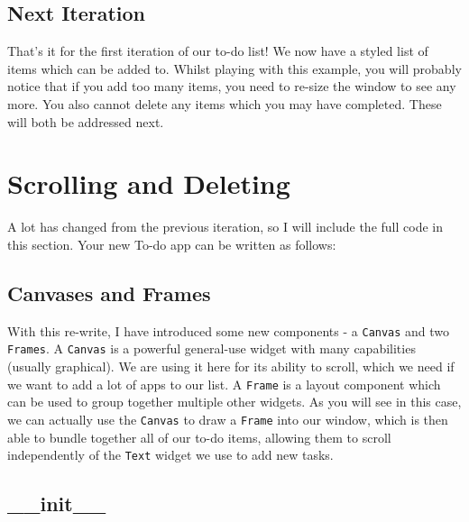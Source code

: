 \documentclass[a4paper,11pt,openany]{book}
\begin{document}
\subsection{Next Iteration}

That's it for the first iteration of our to-do list! We now have a styled list of items which can be added to. Whilst playing with this example, you will probably notice that if you add too many items, you need to re-size the window to see any more. You also cannot delete any items which you may have completed. These will both be addressed next. 

\newpage

\section{Scrolling and Deleting}

A lot has changed from the previous iteration, so I will include the full code in this section. Your new To-do app can be written as follows:



\newpage

\subsection{Canvases and Frames}

With this re-write, I have introduced some new components - a \lstinline[columns=fixed]{Canvas} and two \lstinline[columns=fixed]{Frames}. A \lstinline[columns=fixed]{Canvas} is a powerful general-use widget with many capabilities (usually graphical). We are using it here for its ability to scroll, which we need if we want to add a lot of apps to our list. A \lstinline[columns=fixed]{Frame} is a layout component which can be used to group together multiple other widgets. As you will see in this case, we can actually use the \lstinline[columns=fixed]{Canvas} to draw a \lstinline[columns=fixed]{Frame} into our window, which is then able to bundle together all of our to-do items, allowing them to scroll independently of the \lstinline[columns=fixed]{Text} widget we use to add new tasks.

\subsection{\_\_init\_\_}
\end{document}
